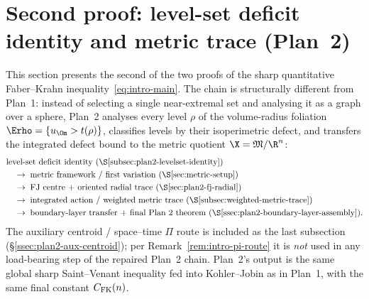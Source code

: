 %

\section{Second proof: level-set deficit identity and metric trace (Plan~2)}
\label{sec:plan2}

This section presents the second of the two proofs of the sharp
quantitative Faber--Krahn inequality~\eqref{eq:intro-main}. The chain
is structurally different from Plan~1: instead of selecting a single
near-extremal set and analysing it as a graph over a sphere, Plan~2
analyses every level $\rho$ of the volume-radius foliation
$\Erho=\{u_\Om>t(\rho)\}$, classifies levels by their isoperimetric
defect, and transfers the integrated defect bound to the metric quotient
$\X=\mathfrak M/\R^n$:
\[
   \begin{aligned}
   &\text{level-set deficit identity (\S\ref{subsec:plan2-levelset-identity})}\\
   &\quad\to\;\text{metric framework / first variation (\S\ref{sec:metric-setup})}\\
   &\quad\to\;\text{FJ centre + oriented radial trace (\S\ref{sec:plan2-fj-radial})}\\
   &\quad\to\;\text{integrated action / weighted metric trace (\S\ref{subsec:weighted-metric-trace})}\\
   &\quad\to\;\text{boundary-layer transfer + final Plan~2 theorem
      (\S\ref{ssec:plan2-boundary-layer-assembly})}.
   \end{aligned}
\]
The auxiliary centroid / space--time $\Pi$ route is included as the
last subsection
(\S\ref{ssec:plan2-aux-centroid}); per
Remark~\ref{rem:intro-pi-route} it is \emph{not} used in any
load-bearing step of the repaired Plan~2 chain. Plan~2's output is
the same global sharp Saint--Venant inequality fed into Kohler--Jobin
as in Plan~1, with the same final constant $C_{\rm FK}(n)$.

